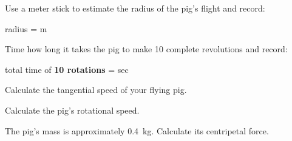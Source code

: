 \documentclass[10pt]{exam}
\begin{document}
\begin{questions}
\question
  Use a meter stick to estimate the radius of the pig's flight and record: 

  \vspace{1em}

  radius = \fillin[][6em] m

  \vspace{1em}

\question
  Time how long it takes the pig to make 10 complete revolutions and record: 

  \vspace{1em}
  
  total time of {\bf 10 rotations} = \fillin[][6em] sec

  \vspace{1em}

\question
  Calculate the tangential speed of your flying pig.  
  \vs

\question
  Calculate the pig's rotational speed.
  \vs

\question
  The pig's mass is approximately 0.4~kg.  Calculate its centripetal force.
  \vs


  


\end{questions}
\end{document}
